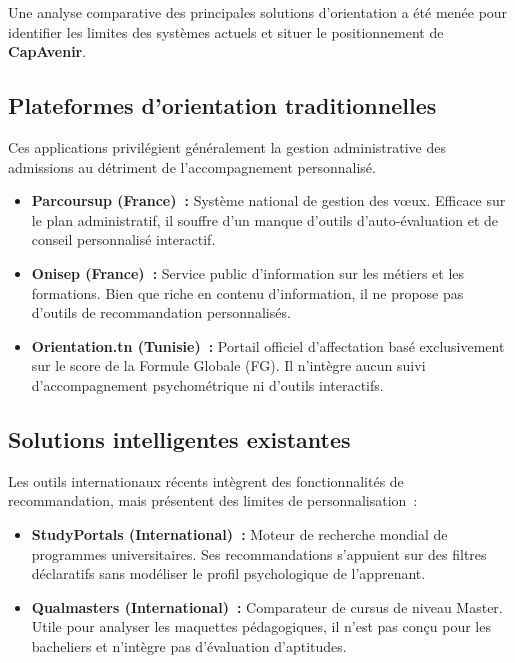 Une analyse comparative des principales solutions d'orientation a été menée pour identifier les limites des systèmes actuels et situer le positionnement de \textbf{CapAvenir}.

\subsection{Plateformes d'orientation traditionnelles}

Ces applications privilégient généralement la gestion administrative des admissions au détriment de l'accompagnement personnalisé.

\begin{itemize}
    \item \textbf{Parcoursup (France)~\cite{parcoursup}:} Système national de gestion des vœux. Efficace sur le plan administratif, il souffre d'un manque d'outils d'auto-évaluation et de conseil personnalisé interactif.
    \item \textbf{Onisep (France)~\cite{onisep}:} Service public d'information sur les métiers et les formations. Bien que riche en contenu d'information, il ne propose pas d'outils de recommandation personnalisés.
    \item \textbf{Orientation.tn (Tunisie)~\cite{orientationtn}:} Portail officiel d'affectation basé exclusivement sur le score de la Formule Globale (FG). Il n'intègre aucun suivi d'accompagnement psychométrique ni d'outils interactifs.
\end{itemize}

\subsection{Solutions intelligentes existantes}

Les outils internationaux récents intègrent des fonctionnalités de recommandation, mais présentent des limites de personnalisation~:

\begin{itemize}
    \item \textbf{StudyPortals (International)~\cite{studyportals}:} Moteur de recherche mondial de programmes universitaires. Ses recommandations s'appuient sur des filtres déclaratifs sans modéliser le profil psychologique de l'apprenant.
    \item \textbf{Qualmasters (International)~\cite{qualmasters}:} Comparateur de cursus de niveau Master. Utile pour analyser les maquettes pédagogiques, il n'est pas conçu pour les bacheliers et n'intègre pas d'évaluation d'aptitudes.
\end{itemize}

